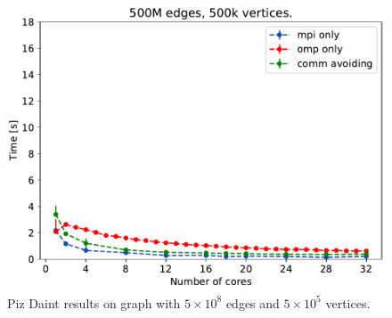 %
%
%



\begin{figure}[H]
\includegraphics[width=\fsize]{data/plot_vertices_500k}
\caption{Piz Daint results on graph with $5\times10^8$ edges and $5\times10^5$ vertices.}
\label{fig:mpi_omp_commavoiding_daint_1}
\end{figure}

